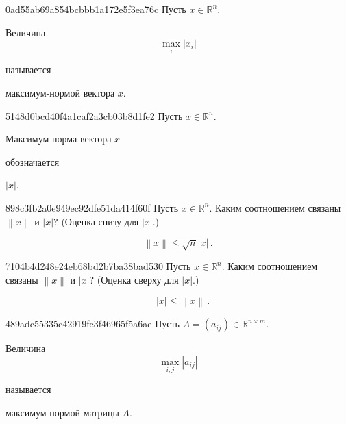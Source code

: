 \begin{note}{0ad55ab69a854bcbbb1a172e5f3ea76c}
    Пусть \({ x \in \mathbb R^{n} }\).
    \begin{icloze}{2}
        Величина
        \[
            \max_i \left\lvert x_i \right\rvert
        \]
    \end{icloze}
    называется \begin{icloze}{1}максимум-нормой вектора \({ x }\).\end{icloze}
\end{note}

\begin{note}{5148d0bcd40f4a1caf2a3cb03b8d1fe2}
    Пусть \({ x \in \mathbb R^{n} }\).
    \begin{icloze}{2}Максимум-норма вектора \({ x }\)\end{icloze} обозначается \begin{icloze}{1}\({ \left\lvert x \right\rvert }\).\end{icloze}
\end{note}

\begin{note}{898c3fb2a0e949ec92dfe51da414f60f}
    Пусть \({ x \in \mathbb R^{n} }\).
    Каким соотношением связаны \({ \left\lVert x \right\rVert }\) и \({ \left\lvert x \right\rvert }\)?
    (Оценка снизу для \({ \left\lvert x \right\rvert }\).)

    \begin{cloze}{1}
        \[
            \left\lVert x \right\rVert \leqslant \sqrt{n} \left\lvert x \right\rvert\,.
        \]
    \end{cloze}
\end{note}

\begin{note}{7104b4d248e24eb68bd2b7ba38bad530}
    Пусть \({ x \in \mathbb R^{n} }\).
    Каким соотношением связаны \({ \left\lVert x \right\rVert }\) и \({ \left\lvert x \right\rvert }\)?
    (Оценка сверху для \({ \left\lvert x \right\rvert }\).)

    \begin{cloze}{1}
        \[
            \quad \left\lvert x \right\rvert \leqslant \left\lVert x \right\rVert\,.
        \]
    \end{cloze}
\end{note}

\begin{note}{489adc55335c42919fe3f46965f5a6ae}
    Пусть \({ A = (a_{ij}) \in \mathbb R^{n \times m} }\).
    \begin{icloze}{2}
        Величина
        \[
            \max_{i,j} \left\lvert a_{ij} \right\rvert
        \]
    \end{icloze}
    называется \begin{icloze}{1}максимум-нормой матрицы \({ A }\).\end{icloze}
\end{note}

